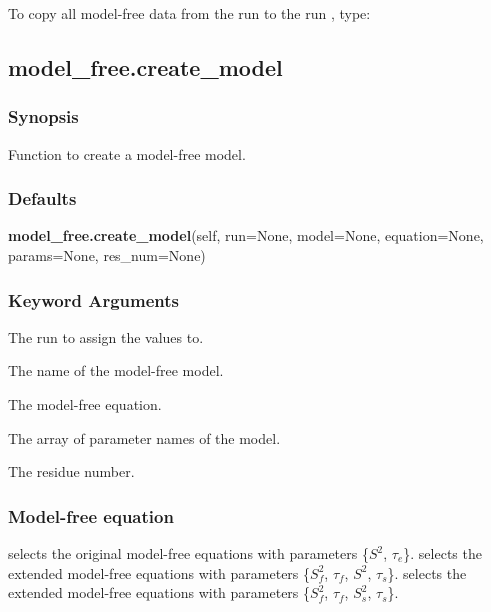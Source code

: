  To copy all model-free data from the run  to the run , type: 
  



  

 \newpage 

 \subsection{model\_free.create\_model} 

  
 \subsubsection{Synopsis} 

 Function to create a model-free model. 
  

  
 \subsubsection{Defaults} 

 \textsf{\textbf{model\_free.create\_model}(self, run=None, model=None, equation=None, params=None, res\_num=None)} 

  
 \subsubsection{Keyword Arguments} 

   The run to assign the values to.   

   The name of the model-free model.   

   The model-free equation.   

   The array of parameter names of the model.   

   The residue number.  

  

  
 \subsubsection{Model-free equation} 

  selects the original model-free equations with parameters \{$S^2$, $\tau_e$\}.  selects the extended model-free equations with parameters \{$S^2_f$, $\tau_f$, $S^2$, $\tau_s$\}.  selects the extended model-free equations with parameters \{$S^2_f$, $\tau_f$, $S^2_s$, $\tau_s$\}. 
  


